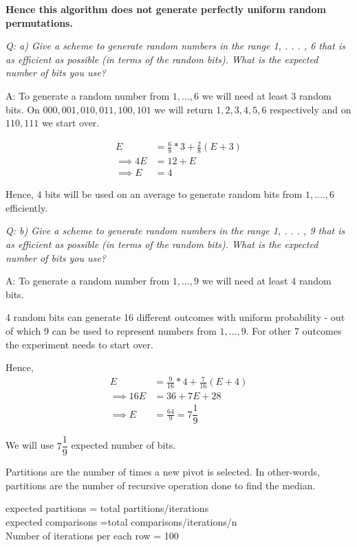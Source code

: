 \documentclass{homeworg}
\begin{document}
\textbf{ Hence this algorithm does not generate perfectly uniform random permutations. }


\newpage

\exercise
\emph {Q: a) Give a scheme to generate random numbers in the range 1, . . . , 6 that is as efficient as possible
(in terms of the random bits). What is the expected number of bits you use?}

A: To generate a random number from $1, ..., 6$ we will need at least 3 random bits. 
On $000, 001,010,011, 100,101$  we will return $1,2,3,4,5,6$ respectively and on $110,111$ we start over.

\begin{align*}
E   &= \frac{6}{8} \ast 3 + \frac{2}{8} (E + 3)\\
\implies 4E  &= 12 + E \\
\implies E  &= 4
\end{align*} 


Hence, $4$ bits will be used on an average to generate random bits from $1,....,6$ efficiently. 

\emph {Q: b)  Give a scheme to generate random numbers in the range 1, . . . , 9 that is as efficient as possible
(in terms of the random bits). What is the expected number of bits you use?}

A: To generate a random number from $1, ..., 9$ we will need at least 4 random bits.

4 random bits can generate 16 different  outcomes with uniform probability - out of which 9 can be used to represent numbers from $1, ..., 9$. For other 7 outcomes the experiment needs to start over. 

Hence,
\begin{align*}
    E & = \frac{9}{16} \ast 4 + \frac{7}{16} (E+4)\\
    \implies 16E & = 36 + 7E + 28\\
    \implies E & = \frac{64}{9} = 7\dfrac{1}{9} 
\end{align*}

We will use $7\dfrac{1}{9}$ expected number of bits.
\newpage

\exercise
Partitions are the number of times a new pivot is selected. In other-words, partitions are the number of recursive operation done to find the median. 

expected partitions = total partitions/iterations\\
expected comparisons =total comparisons/iterations/n\\
Number of iterations per each row = 100
\end{document}
